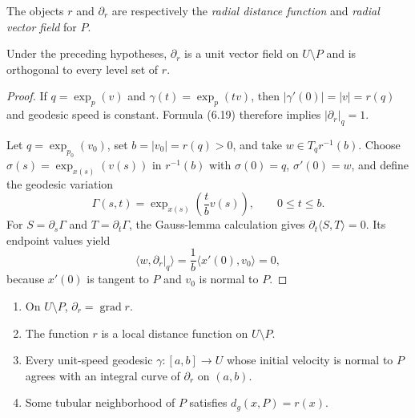The objects $r$ and $\partial_r$ are respectively the \emph{radial distance
function} and \emph{radial vector field} for $P$.

\begin{theorem}
\label{thm:gauss-lemma-submanifolds}


Under the preceding hypotheses, $\partial_r$ is a unit vector field on
$U\setminus P$ and is orthogonal to every level set of $r$.
\end{theorem}

\begin{proof}
\sketch If $q=\exp_p(v)$ and $\gamma(t)=\exp_p(tv)$, then
$|\gamma'(0)|=|v|=r(q)$ and geodesic speed is constant. Formula (6.19) therefore
implies $|\partial_r|_q=1$.

Let $q=\exp_{p_0}(v_0)$, set $b=|v_0|=r(q)>0$, and take
$w\in T_qr^{-1}(b)$. Choose
$\sigma(s)=\exp_{x(s)}(v(s))$ in $r^{-1}(b)$ with
$\sigma(0)=q$, $\sigma'(0)=w$, and define the geodesic variation
\[
\Gamma(s,t)=\exp_{x(s)}\left(\frac tbv(s)\right),
\qquad 0\leq t\leq b.
\]
For $S=\partial_s\Gamma$ and $T=\partial_t\Gamma$, the Gauss-lemma
calculation gives $\partial_t\langle S,T\rangle=0$. Its endpoint values yield
\[
\langle w,\partial_r|_q\rangle
=\frac1b\langle x'(0),v_0\rangle=0,
\]
because $x'(0)$ is tangent to $P$ and $v_0$ is normal to $P$.
\end{proof}

\begin{corollary}
\label{cor:distance-function-local-properties}


\begin{enumerate}
\item[(a)] On $U\setminus P$, $\partial_r=\operatorname{grad}r$.
\item[(b)] The function $r$ is a local distance function on $U\setminus P$.
\item[(c)] Every unit-speed geodesic $\gamma:[a,b]\to U$ whose initial
velocity is normal to $P$ agrees with an integral curve of $\partial_r$ on
$(a,b)$.
\item[(d)] Some tubular neighborhood of $P$ satisfies
$d_g(x,P)=r(x)$.
\end{enumerate}
\end{corollary}

